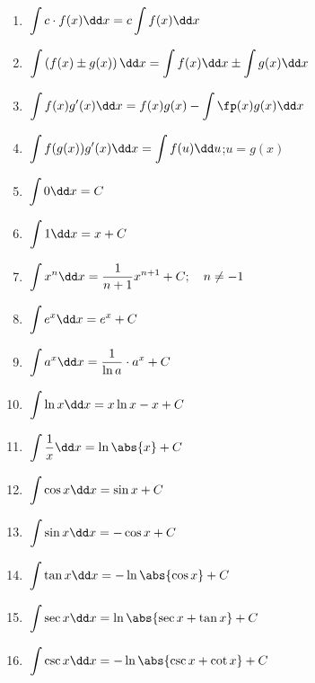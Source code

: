 \newcommand{\intRuleStrut}{\vphantom{\dfrac1{\sqrt{x^2}}}}
\noindent{}\parbox[t]{.34\linewidth}{%
\begin{enumerate}
\item $\intRuleStrut\ds\int c\cdot f(x)\dd x=c\int f(x)\dd x$
\item $\intRuleStrut\ds\int\left(f(x)\pm g(x)\right)\dd x=\int f(x)\dd x\pm\int g(x)\dd x$
\item $\intRuleStrut\ds\int f(x)g'(x)\dd x=f(x)g(x)-\int\fp(x)g(x)\dd x$
\item $\intRuleStrut\ds\int f(g(x))g'(x)\dd x=\int f(u)\dd u$;\quad $u=g(x)$
\item $\intRuleStrut\ds\int0\dd x=C$
\item $\intRuleStrut\ds\int1\dd x=x+C$
\item $\intRuleStrut\ds\int x^n\dd x=\frac1{n+1}x^{n+1}+C;\quad n\ne-1$
\item $\intRuleStrut\ds\int e^x\dd x=e^x+C$
\item $\intRuleStrut\ds\int a^x\dd x=\frac1{\ln a}\cdot a^x+C$
\item $\intRuleStrut\ds\int\ln x\dd x=x\ln x-x+C$
\item $\intRuleStrut\ds\int\frac1x\dd x=\ln \abs{x} + C$
\item $\intRuleStrut\ds\int\cos x\dd x=\sin x+C$
\item $\intRuleStrut\ds\int\sin x\dd x=-\cos x+C$
\item $\intRuleStrut\ds\int\tan x\dd x=-\ln \abs{\cos x}+C$
\item $\intRuleStrut\ds\int\sec x\dd x=\ln \abs{\sec x+\tan x}+C$
\item $\intRuleStrut\ds\int\csc x\dd x=-\ln \abs{\csc x+\cot x}+C$
\end{enumerate}}%
\hfill
